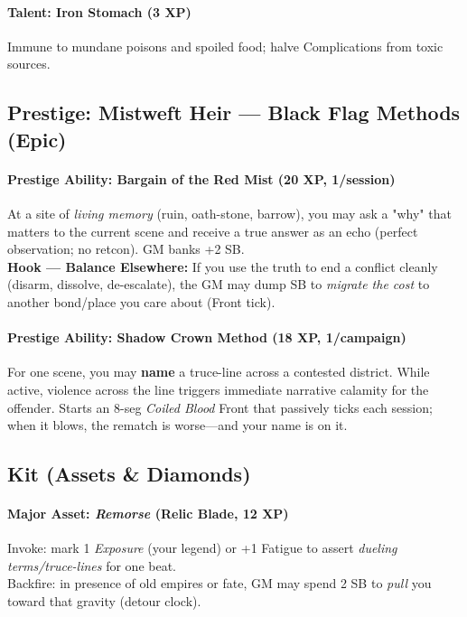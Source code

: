 \paragraph{Talent: Iron Stomach (3 XP)}
Immune to mundane poisons and spoiled food; halve Complications from toxic sources.

\subsection{Prestige: Mistweft Heir — Black Flag Methods (Epic)}
\paragraph{Prestige Ability: Bargain of the Red Mist (20 XP, 1/session)}
At a site of \emph{living memory} (ruin, oath-stone, barrow), you may ask a "why" that matters to the current scene and receive a true answer as an echo (perfect observation; no retcon). GM banks +2 SB. \\
\textbf{Hook — Balance Elsewhere:} If you use the truth to end a conflict cleanly (disarm, dissolve, de-escalate), the GM may dump SB to \emph{migrate the cost} to another bond/place you care about (Front tick).

\paragraph{Prestige Ability: Shadow Crown Method (18 XP, 1/campaign)}
For one scene, you may \textbf{name} a truce-line across a contested district. While active, violence across the line triggers immediate narrative calamity for the offender. Starts an 8-seg \emph{Coiled Blood} Front that passively ticks each session; when it blows, the rematch is worse—and your name is on it.

\subsection{Kit (Assets \& Diamonds)}
\paragraph{Major Asset: \emph{Remorse} (Relic Blade, 12 XP)}
Invoke: mark 1 \emph{Exposure} (your legend) or +1 Fatigue to assert \emph{dueling terms/truce-lines} for one beat. \\
Backfire: in presence of old empires or fate, GM may spend 2 SB to \emph{pull} you toward that gravity (detour clock).

